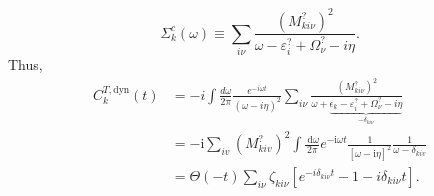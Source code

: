 \begin{equation}
\Sigma _k^{c}(\omega)\equiv\sum_{i\nu} \frac{\left(M_{ki\nu}^?\right)^2}{\omega  - \varepsilon_i^{?} + \Omega_\nu^? - i \eta}.
\end{equation}
Thus,
\begin{align}
C_k^{T,\text{dyn}}(t)
&=
-i
\int \frac{d\omega}{2\pi}
\frac{e^{-i\omega t}}{(\omega - i\eta)^2}\sum_{i\nu} \frac{\left(M_{ki\nu}^?\right)^2}{\omega +\underbrace{\epsilon_k - \varepsilon_i^? + \Omega_\nu^? - i \eta}_{-\delta_{ki\nu}}} \\
&=-\mathrm{i} \sum_{i v} \left(M_{k i v}^?\right)^2 \int \frac{\mathrm{~d} \omega}{2 \pi} e^{-\mathrm{i} \omega t} \frac{1}{[\omega - \mathrm{i} \eta]^2} \frac{1}{\omega-\delta_{k i v}} \\
&=\Theta(-t)\sum_{i\nu} \zeta_{ki\nu} \left[ e^{-i\delta_{ki\nu} t} - 1 - i\delta_{ki\nu} t \right].
\end{align}
